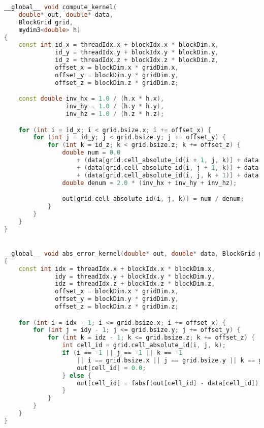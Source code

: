 \documentclass[12pt]{article}
\begin{document}
\begin{lstlisting}[language=c++,basicstyle=\scriptsize]
__global__ void compute_kernel(
    double* out, double* data,
    BlockGrid grid,
    mydim3<double> h)
{
    const int id_x = threadIdx.x + blockIdx.x * blockDim.x,
              id_y = threadIdx.y + blockIdx.y * blockDim.y,
              id_z = threadIdx.z + blockIdx.z * blockDim.z,
              offset_x = blockDim.x * gridDim.x,
              offset_y = blockDim.y * gridDim.y,
              offset_z = blockDim.z * gridDim.z;

    const double inv_hx = 1.0 / (h.x * h.x),
                 inv_hy = 1.0 / (h.y * h.y),
                 inv_hz = 1.0 / (h.z * h.z);

    for (int i = id_x; i < grid.bsize.x; i += offset_x) {
        for (int j = id_y; j < grid.bsize.y; j += offset_y) {
            for (int k = id_z; k < grid.bsize.z; k += offset_z) {
                double num = 0.0
                    + (data[grid.cell_absolute_id(i + 1, j, k)] + data[grid.cell_absolute_id(i - 1, j, k)]) * inv_hx
                    + (data[grid.cell_absolute_id(i, j + 1, k)] + data[grid.cell_absolute_id(i, j - 1, k)]) * inv_hy
                    + (data[grid.cell_absolute_id(i, j, k + 1)] + data[grid.cell_absolute_id(i, j, k - 1)]) * inv_hz;
                double denum = 2.0 * (inv_hx + inv_hy + inv_hz);

                out[grid.cell_absolute_id(i, j, k)] = num / denum;
            }
        }
    }
}


__global__ void abs_error_kernel(double* out, double* data, BlockGrid grid)
{
    const int idx = threadIdx.x + blockIdx.x * blockDim.x,
              idy = threadIdx.y + blockIdx.y * blockDim.y,
              idz = threadIdx.z + blockIdx.z * blockDim.z,
              offset_x = blockDim.x * gridDim.x,
              offset_y = blockDim.y * gridDim.y,
              offset_z = blockDim.z * gridDim.z;

    for (int i = idx - 1; i <= grid.bsize.x; i += offset_x) {
        for (int j = idy - 1; j <= grid.bsize.y; j += offset_y) {
            for (int k = idz - 1; k <= grid.bsize.z; k += offset_z) {
                int cell_id = grid.cell_absolute_id(i, j, k);
                if (i == -1 || j == -1 || k == -1
                    || i == grid.bsize.x || j == grid.bsize.y || k == grid.bsize.z) {
                    out[cell_id] = 0.0;
                } else {
                    out[cell_id] = fabsf(out[cell_id] - data[cell_id]);
                }
            }
        }
    }
}


\end{lstlisting}
\end{document}
